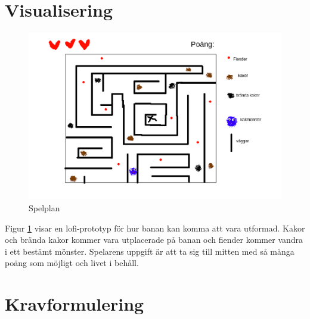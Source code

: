 \documentclass{TDP005mall}
\begin{document}
\section{Visualisering}

\begin{figure}
  \includegraphics[scale=0.5]{Banavis.png}
  \caption{Spelplan}
  \label{fig:game}
\end{figure}

Figur \ref{fig:game} visar en lofi-prototyp för hur banan kan komma att vara utformad. Kakor och
brända kakor kommer vara utplacerade på banan och fiender kommer vandra i ett
bestämt mönster. Spelarens uppgift är att ta sig till mitten med så många poäng
som möjligt och livet i behåll.

\newpage

\section{Kravformulering}
\end{document}
